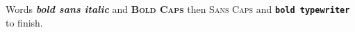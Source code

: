 \documentclass{article}
\begin{document}
Words \textsf{\textbf{\textit{bold sans italic}}} and \textbf{\textsc{Bold Caps}} then \textsf{\textsc{Sans Caps}} and \texttt{\textbf{bold typewriter}} to finish.
\end{document}
